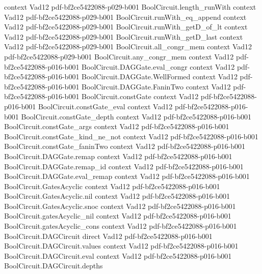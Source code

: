 \begin{theorem}
  {context}
  {Vad12}
  {pdf-bf2ce5422088-p029-b001}
\proofstep
  {BoolCircuit.length_runWith}
  {context}
  {Vad12}
  {pdf-bf2ce5422088-p029-b001}
\proofstep
  {BoolCircuit.runWith_eq_append}
  {context}
  {Vad12}
  {pdf-bf2ce5422088-p029-b001}
\proofstep
  {BoolCircuit.runWith_getD_of_lt}
  {context}
  {Vad12}
  {pdf-bf2ce5422088-p029-b001}
\proofstep
  {BoolCircuit.runWith_getD_last}
  {context}
  {Vad12}
  {pdf-bf2ce5422088-p029-b001}
\proofstep
  {BoolCircuit.all_congr_mem}
  {context}
  {Vad12}
  {pdf-bf2ce5422088-p029-b001}
\proofstep
  {BoolCircuit.any_congr_mem}
  {context}
  {Vad12}
  {pdf-bf2ce5422088-p016-b001}
\proofstep
  {BoolCircuit.DAGGate.eval_congr}
  {context}
  {Vad12}
  {pdf-bf2ce5422088-p016-b001}
\proofstep
  {BoolCircuit.DAGGate.WellFormed}
  {context}
  {Vad12}
  {pdf-bf2ce5422088-p016-b001}
\proofstep
  {BoolCircuit.DAGGate.FaninTwo}
  {context}
  {Vad12}
  {pdf-bf2ce5422088-p016-b001}
\proofstep
  {BoolCircuit.constGate}
  {context}
  {Vad12}
  {pdf-bf2ce5422088-p016-b001}
\proofstep
  {BoolCircuit.constGate_eval}
  {context}
  {Vad12}
  {pdf-bf2ce5422088-p016-b001}
\proofstep
  {BoolCircuit.constGate_depth}
  {context}
  {Vad12}
  {pdf-bf2ce5422088-p016-b001}
\proofstep
  {BoolCircuit.constGate_args}
  {context}
  {Vad12}
  {pdf-bf2ce5422088-p016-b001}
\proofstep
  {BoolCircuit.constGate_kind_ne_not}
  {context}
  {Vad12}
  {pdf-bf2ce5422088-p016-b001}
\proofstep
  {BoolCircuit.constGate_faninTwo}
  {context}
  {Vad12}
  {pdf-bf2ce5422088-p016-b001}
\proofstep
  {BoolCircuit.DAGGate.remap}
  {context}
  {Vad12}
  {pdf-bf2ce5422088-p016-b001}
\proofstep
  {BoolCircuit.DAGGate.remap_id}
  {context}
  {Vad12}
  {pdf-bf2ce5422088-p016-b001}
\proofstep
  {BoolCircuit.DAGGate.eval_remap}
  {context}
  {Vad12}
  {pdf-bf2ce5422088-p016-b001}
\proofstep
  {BoolCircuit.GatesAcyclic}
  {context}
  {Vad12}
  {pdf-bf2ce5422088-p016-b001}
\proofstep
  {BoolCircuit.GatesAcyclic.nil}
  {context}
  {Vad12}
  {pdf-bf2ce5422088-p016-b001}
\proofstep
  {BoolCircuit.GatesAcyclic.snoc}
  {context}
  {Vad12}
  {pdf-bf2ce5422088-p016-b001}
\proofstep
  {BoolCircuit.gatesAcyclic_nil}
  {context}
  {Vad12}
  {pdf-bf2ce5422088-p016-b001}
\proofstep
  {BoolCircuit.gatesAcyclic_cons}
  {context}
  {Vad12}
  {pdf-bf2ce5422088-p016-b001}
\proofstep
  {BoolCircuit.DAGCircuit}
  {direct}
  {Vad12}
  {pdf-bf2ce5422088-p016-b001}
\proofstep
  {BoolCircuit.DAGCircuit.values}
  {context}
  {Vad12}
  {pdf-bf2ce5422088-p016-b001}
\proofstep
  {BoolCircuit.DAGCircuit.eval}
  {context}
  {Vad12}
  {pdf-bf2ce5422088-p016-b001}
\proofstep
  {BoolCircuit.DAGCircuit.depths}

\end{theorem}
